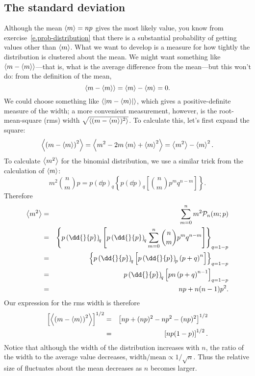 \subsection{The standard deviation}
Although the mean $\left\langle m\right\rangle = np$ gives the most likely value, you know from exercise~\ref{e.prob-distribution} that there is a substantial probability of getting values other than $\left\langle m\right\rangle$. What we want to develop is a measure for how tightly the distribution is clustered about the mean.  We might want something like $\left\langle m-\left\langle m\right\rangle\right\rangle$---that is, what is the average difference from the mean---but this won't do: from the definition of the mean,
\[ \left\langle m-\left\langle m\right\rangle\right\rangle = \left\langle m\right\rangle-\left\langle m\right\rangle = 0. \]
We could choose something like $\left\langle\left|m-\left\langle m\right\rangle\right|\right\rangle$, which gives a positive-definite measure of the width; a more convenient measurement, however, is the root-mean-square (rms) width $\sqrt{\left\langle(m-\left\langle m\right\rangle)^{2}\right\rangle}$.  To calculate this, let's first expand the square:
\[
	\left\langle\left(m-\left\langle m\right\rangle\right)^{2}\right\rangle = \left\langle m^{2} - 2m\left\langle m\right\rangle + \left\langle m\right\rangle^{2}\right\rangle
		= \left\langle m^{2}\right\rangle - \left\langle m\right\rangle^{2}.
\]
To calculate $\left\langle m^{2}\right\rangle$ for the binomial distribution, we use a similar trick from the calculation of $\left\langle m\right\rangle$:
\[
	m^{2}\binom{n}{m}{p} = p\left(\dd{}{p}\right)_{\!q}\left\{ p\left(\dd{}{p}\right)_{\!q} 
	\left[{n\choose m} p^{m}q^{n-m}\right]\right\}.
\]
Therefore
\begin{eqnarray*}
	\mean{m^{2}} &=& \sum_{m=0}^{n}m^{2}\binom{n}{m}{p} \\
	&=& \left\{p\left(\dd{}{p}\right)_{\!q}\left[p\left(\dd{}{p}\right)_{\!q}\sum_{m=0}^{n}{n\choose m}p^{m}q^{n-m}\right]\right\}_{q=1-p} \\
	&=& \left\{p\left(\dd{}{p}\right)_{\!q}\left[p\left(\dd{}{p}\right)_{\!p}\left(p+q\right)^{n}\right]\right\}_{q=1-p} \\
	&=& p\left(\dd{}{p}\right)_{\!q}\left[pn\left(p+q\right)^{n-1}\right]_{q=1-p} \\
	&=& np + n(n-1)p^{2}.
\end{eqnarray*}
Our expression for the rms width is therefore
\begin{eqnarray}
	\left[\left\langle\left(m-\left\langle m\right\rangle\right)^{2}\right\rangle\right]^{1/2} &=& \left[ np + (np)^{2}-np^{2} - (np)^{2}\right]^{1/2}\nonumber\\
	 &=& \left[np(1-p)\right]^{1/2}.
\end{eqnarray}
Notice that although the width of the distribution increases with $n$, the ratio of the width to the average value decreases, $\textrm{width}/\textrm{mean} \propto 1/\sqrt{n}$.  Thus the relative size of fluctuates about the mean decreases as $n$ becomes larger.

